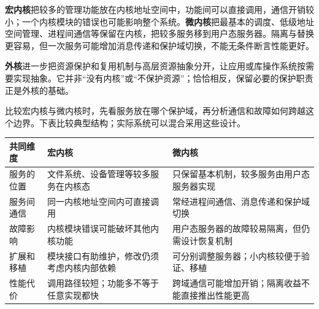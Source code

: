 \textbf{宏内核}把较多的管理功能放在内核地址空间中，功能间可以直接调用，通信开销较小；一个内核模块的错误也可能影响整个系统。\textbf{微内核}把最基本的调度、低级地址空间管理、进程间通信等保留在内核，把较多服务移到用户态服务器。隔离与替换更容易，但一次服务可能增加消息传递和保护域切换，不能无条件断言性能更好。

\textbf{外核}进一步把资源保护和复用机制与高层资源抽象分开，让应用或库操作系统按需要实现抽象。它并非``没有内核''或``不保护资源''；恰恰相反，保留必要的保护职责正是外核的基础。

比较宏内核与微内核时，先看服务放在哪个保护域，再分析通信和故障如何跨越这个边界。下表比较典型结构；实际系统可以混合采用这些设计。

\begin{wideblock}

\par\medskip\noindent\begin{minipage}{\linewidth}\fontsize{9.3}{12}\selectfont\begin{tabularx}{\linewidth}{@{}YYY@{}}
\toprule\noalign{}
\begin{minipage}[b]{\linewidth}\raggedright
共同维度
\end{minipage} & \begin{minipage}[b]{\linewidth}\raggedright
宏内核
\end{minipage} & \begin{minipage}[b]{\linewidth}\raggedright
微内核
\end{minipage} \\
\midrule\noalign{}


服务的位置 & 文件系统、设备管理等较多服务在内核态 & 只保留基本机制，较多服务由用户态服务器实现 \\
服务间通信 & 同一内核地址空间内可直接调用 & 常经进程间通信、消息传递和保护域切换 \\
故障影响 & 内核模块错误可能破坏其他内核功能 & 用户态服务器的故障较易隔离，但仍需设计恢复机制 \\
扩展和移植 & 模块接口有助维护，修改仍须考虑内核内部依赖 & 可分别调整服务器；小内核较便于验证、移植 \\
性能代价 & 调用路径较短；功能多不等于任意实现都快 & 跨域通信可能增加开销；隔离收益不能直接推出性能更高 \\
\bottomrule\end{tabularx}
\end{minipage}\par\medskip

\end{wideblock}

